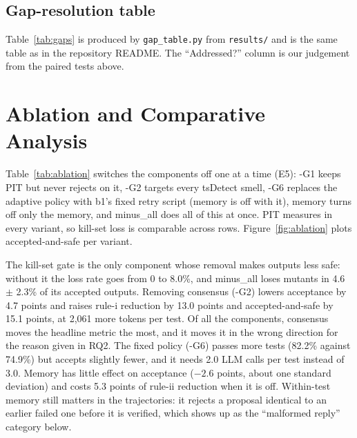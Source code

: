 \subsection{Gap-resolution table}
Table~\ref{tab:gaps} is produced by \texttt{gap\_table.py} from \texttt{results/} and is the same table as in the repository README. The ``Addressed?'' column is our judgement from the paired tests above.
\begin{table}[t]\centering\caption{Gap-resolution table (identical to the README). Base-paper cells state whether the number was reproduced by us or reported in~\cite{utrefactor}.}\label{tab:gaps}\footnotesize{\let\oldtt\texttt\renewcommand{\texttt}[1]{{\scriptsize\oldtt{#1}}}}\end{table}

\section{Ablation and Comparative Analysis}\label{sec:ablation}
Table~\ref{tab:ablation} switches the components off one at a time (E5): \textsf{-G1} keeps PIT but never rejects on it, \textsf{-G2} targets every tsDetect smell, \textsf{-G6} replaces the adaptive policy with \textsf{b1}'s fixed retry script (memory is off with it), \textsf{memory} turns off only the memory, and \textsf{minus\_all} does all of this at once. PIT measures in every variant, so kill-set loss is comparable across rows. Figure~\ref{fig:ablation} plots accepted-and-safe per variant.

The kill-set gate is the only component whose removal makes outputs less safe: without it the loss rate goes from 0 to 8.0\%, and \textsf{minus\_all} loses mutants in 4.6 $\pm$ 2.3\% of its accepted outputs.
Removing consensus (\textsf{-G2}) lowers acceptance by 4.7 points and raises rule-i reduction by 13.0 points and accepted-and-safe by 15.1 points, at 2{,}061 more tokens per test. Of all the components, consensus moves the headline metric the most, and it moves it in the wrong direction for the reason given in RQ2.
The fixed policy (\textsf{-G6}) passes more tests (82.2\% against 74.9\%) but accepts slightly fewer, and it needs 2.0 LLM calls per test instead of 3.0. Memory has little effect on acceptance ($-2.6$ points, about one standard deviation) and costs 5.3 points of rule-ii reduction when it is off.
Within-test memory still matters in the trajectories: it rejects a proposal identical to an earlier failed one before it is verified, which shows up as the ``malformed reply'' category below.

